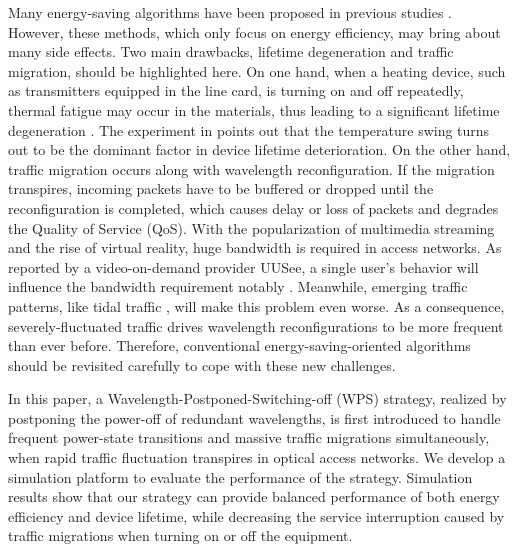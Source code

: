 \documentclass[letter]{IEEEtran}
\begin{document}
Many energy-saving algorithms have been proposed in previous studies \cite{6069715,6320604,7249119}. However, these methods, which only focus on energy efficiency, may bring about many side effects. Two main drawbacks, lifetime degeneration and traffic migration, should be highlighted here. On one hand, when a heating device, such as transmitters equipped in the line card, is turning on and off repeatedly, thermal fatigue may occur in the materials, thus leading to a significant lifetime degeneration \cite{kressel2006semiconductor}. The experiment in \cite{schulz2012thermal} points out that the temperature swing turns out to be the dominant factor in device lifetime deterioration. On the other hand, traffic migration occurs along with wavelength reconfiguration. If the migration transpires, incoming packets have to be buffered or dropped until the reconfiguration is completed, which causes delay or loss of packets and degrades the Quality of Service (QoS). With the popularization of multimedia streaming and the rise of virtual reality, huge bandwidth is required in access networks. As reported by a video-on-demand provider UUSee, a single user's behavior will influence the bandwidth requirement notably \cite{6195785}. Meanwhile, emerging traffic patterns, like tidal traffic \cite{7444562}, will make this problem even worse.  As a consequence, severely-fluctuated traffic drives wavelength reconfigurations to be more frequent than ever before. Therefore, conventional energy-saving-oriented algorithms should be revisited carefully to cope with these new challenges.

In this paper, a Wavelength-Postponed-Switching-off (WPS) strategy, realized by postponing the power-off of redundant wavelengths, is first introduced to handle frequent power-state transitions and massive traffic migrations simultaneously, when rapid traffic fluctuation transpires in optical access networks. We develop a simulation platform to evaluate the performance of the strategy. Simulation results show that our strategy can provide balanced performance of both energy efficiency and device lifetime, while decreasing the service interruption caused by traffic migrations when turning on or off the equipment.


 

\end{document}
